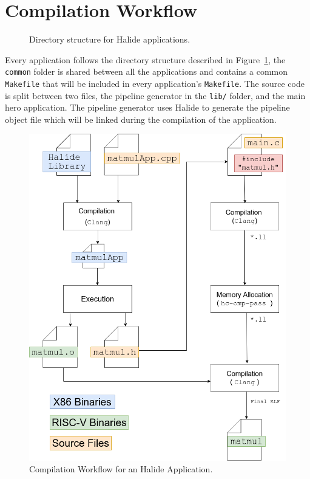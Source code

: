     \section{Compilation Workflow}

\begin{figure}[H]
    \caption{Directory structure for Halide applications.}
    \label{Fig:DirectoryStructure}
\end{figure}



    Every application follows the directory structure described in Figure~\ref{Fig:DirectoryStructure}, the \texttt{common} folder is shared between all the applications and contains a common \texttt{Makefile} that will be included in every application's \texttt{Makefile}.
    The source code is split between two files, the pipeline generator in the \texttt{lib/} folder, and the main \gls{hero} application.
    The pipeline generator uses Halide to generate the pipeline object file which will be linked during the compilation of the application.

\begin{figure}[h]
    \centering
    \includegraphics[width=.7\textwidth]{./figures_raw/compilationWorkflow.png}
    \caption{Compilation Workflow for an Halide Application.}
    \label{fig:compwork}
\end{figure}

